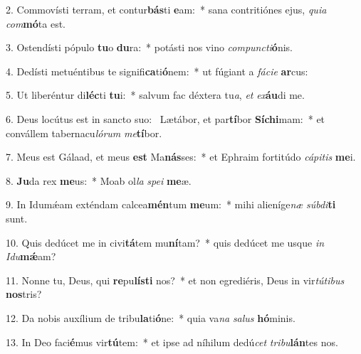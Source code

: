 2. Commovísti terram, et contur\textbf{bás}ti \textbf{e}am:~*  sana contritiónes ejus, \textit{qui}\textit{a} \textit{com}\textbf{mó}ta est.\

3. Ostendísti pópulo \textbf{tu}o \textbf{du}ra:~*  potásti nos vino \textit{com}\textit{punc}\textit{ti}\textbf{ó}nis.\

4. Dedísti metuéntibus te signifi\textbf{ca}ti\textbf{ó}nem:~*  ut fúgiant a \textit{fá}\textit{ci}\textit{e} \textbf{ar}cus:\

5. Ut liberéntur di\textbf{léc}ti \textbf{tu}i:~*  salvum fac déxtera tu\textit{a}, \textit{et} \textit{ex}\textbf{áu}di me.\

6. Deus locútus est in sancto suo: \dag\  Lætábor, et par\textbf{tí}bor \textbf{Sí}\textbf{chi}mam:~*  et convállem tabernacu\textit{ló}\textit{rum} \textit{me}\textbf{tí}bor.\

7. Meus est Gálaad, et meus \textbf{est} Ma\textbf{nás}ses:~*  et Ephraim fortitúdo \textit{cá}\textit{pi}\textit{tis} \textbf{me}i.\

8. \textbf{Ju}da rex \textbf{me}us:~*  Moab ol\textit{la} \textit{spe}\textit{i} \textbf{me}æ.\

9. In Idumǽam exténdam calcea\textbf{mén}tum \textbf{me}um:~*  mihi alieníge\textit{næ} \textit{súb}\textit{di}\textbf{ti} sunt.\

10. Quis dedúcet me in civi\textbf{tá}tem mu\textbf{ní}tam?~*  quis dedúcet me usque \textit{in} \textit{I}\textit{du}\textbf{mǽ}am?\

11. Nonne tu, Deus, qui \textbf{re}pu\textbf{lís}\textbf{ti} nos?~*  et non egrediéris, Deus in vir\textit{tú}\textit{ti}\textit{bus} \textbf{nos}tris?\

12. Da nobis auxílium de tribu\textbf{la}ti\textbf{ó}ne:~*  quia va\textit{na} \textit{sa}\textit{lus} \textbf{hó}minis.\

13. In Deo faci\textbf{é}mus vir\textbf{tú}tem:~*  et ipse ad níhilum dedú\textit{cet} \textit{tri}\textit{bu}\textbf{lán}tes nos.\

